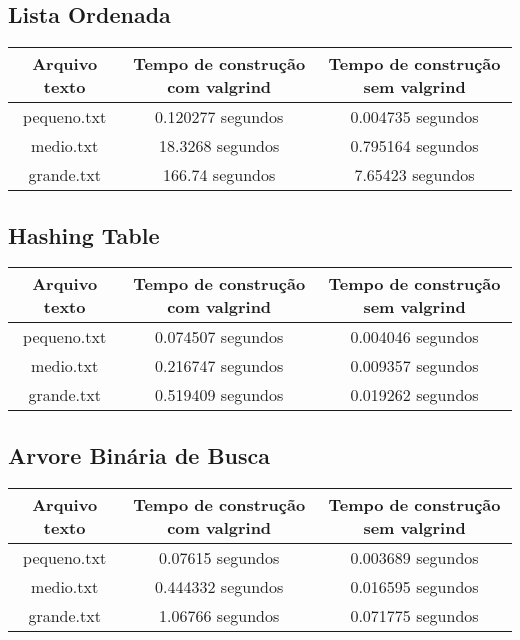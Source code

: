\documentclass{article}
\begin{document}
\subsection{Lista Ordenada}

\label{SampleTable}
\begin{tabular}[t]{|c|c|c|}
\hline
\textbf{Arquivo texto} & \textbf{Tempo de construção com valgrind} & \textbf{Tempo de construção sem valgrind} \\
\hline\hline
pequeno.txt & 0.120277 segundos & 0.004735 segundos \\
\hline
medio.txt & 18.3268 segundos &  0.795164 segundos\\
\hline
grande.txt & 166.74 segundos &  7.65423 segundos\\
\hline
\end{tabular}


\subsection{Hashing Table}

\label{SampleTable}
\begin{tabular}[t]{|c|c|c|}
\hline
\textbf{Arquivo texto} & \textbf{Tempo de construção com valgrind} & \textbf{Tempo de construção sem valgrind} \\
\hline\hline
pequeno.txt & 0.074507 segundos & 0.004046 segundos \\
\hline
medio.txt & 0.216747 segundos & 0.009357 segundos \\
\hline
grande.txt & 0.519409 segundos & 0.019262 segundos \\
\hline
\end{tabular}


\subsection{Arvore Binária de Busca}

\label{SampleTable}
\begin{tabular}[t]{|c|c|c|}
\hline
\textbf{Arquivo texto} & \textbf{Tempo de construção com valgrind} & \textbf{Tempo de construção sem valgrind} \\
\hline\hline
pequeno.txt & 0.07615 segundos & 0.003689 segundos \\
\hline
medio.txt & 0.444332 segundos & 0.016595 segundos \\
\hline
grande.txt & 1.06766 segundos & 0.071775 segundos \\
\hline
\end{tabular}
\end{document}
